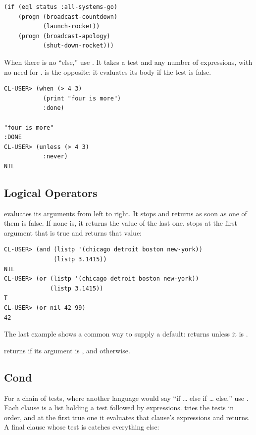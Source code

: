 \begin{verbatim}
(if (eql status :all-systems-go)
    (progn (broadcast-countdown)
           (launch-rocket))
    (progn (broadcast-apology)
           (shut-down-rocket)))
\end{verbatim}

When there is no ``else,'' use . It takes a test and any
number of expressions, with no need for .
 is the opposite: it evaluates its body if the test is
false.

\begin{verbatim}
CL-USER> (when (> 4 3)
           (print "four is more")
           :done)

"four is more"
:DONE
CL-USER> (unless (> 4 3)
           :never)
NIL
\end{verbatim}

\subsection{Logical Operators}

 evaluates its arguments from left to right. It stops and
returns  as soon as one of them is false. If none is, it
returns the value of the last one.  stops at the first
argument that is true and returns that value:

\begin{verbatim}
CL-USER> (and (listp '(chicago detroit boston new-york))
              (listp 3.1415))
NIL
CL-USER> (or (listp '(chicago detroit boston new-york))
             (listp 3.1415))
T
CL-USER> (or nil 42 99)
42
\end{verbatim}

The last example shows a common way to supply a default:
 returns  unless it is
.

 returns  if its argument is , and
 otherwise.

\subsection{Cond}

For a chain of tests, where another language would say ``if \ldots{}
else if \ldots{} else,'' use . Each clause is a list holding
a test followed by expressions.  tries the tests in order,
and at the first true one it evaluates that clause's expressions and
returns. A final clause whose test is  catches everything
else:

